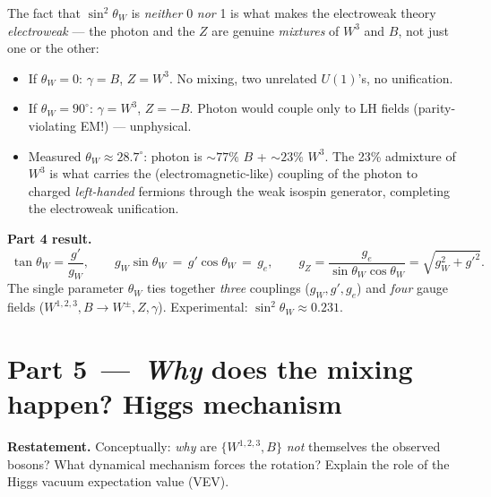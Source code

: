 \documentclass[11pt]{article}
\begin{document}
\begin{intuitionbox}
The fact that $\sin^2\theta_W$ is \emph{neither} 0 \emph{nor} 1 is what makes the
electroweak theory \emph{electroweak} --- the photon and the $Z$ are genuine \emph{mixtures}
of $W^3$ and $B$, not just one or the other:
\begin{itemize}[leftmargin=*]
  \item If $\theta_W = 0$: $\gamma = B$, $Z = W^3$. No mixing, two unrelated $U(1)$'s, no
        unification.
  \item If $\theta_W = 90^\circ$: $\gamma = W^3$, $Z = -B$. Photon would couple only to LH
        fields (parity-violating EM!) --- unphysical.
  \item Measured $\theta_W \approx 28.7^\circ$: photon is $\sim 77\%$ $B$ + $\sim 23\%$ $W^3$.
        The 23\% admixture of $W^3$ is what carries the (electromagnetic-like) coupling of the
        photon to charged \emph{left-handed} fermions through the weak isospin generator,
        completing the electroweak unification.
\end{itemize}
\end{intuitionbox}

\begin{resultbox}
\textbf{Part 4 result.}
\[
\boxed{\;
\tan\theta_W = \frac{g'}{g_W},
\qquad
g_W \sin\theta_W \,=\, g' \cos\theta_W \,=\, g_e,
\qquad
g_Z = \frac{g_e}{\sin\theta_W\cos\theta_W} = \sqrt{g_W^2 + g'^2}.
\;}
\]
The single parameter $\theta_W$ ties together \emph{three} couplings ($g_W, g', g_e$) and
\emph{four} gauge fields ($W^{1,2,3}, B \to W^\pm, Z, \gamma$). Experimental:
$\sin^2\theta_W \approx 0.231$.
\end{resultbox}

\newpage

\section*{Part 5 \,---\, \emph{Why} does the mixing happen? Higgs mechanism}

\begin{problembox}
\textbf{Restatement.} Conceptually: \emph{why} are $\{W^{1,2,3}, B\}$ \emph{not} themselves
the observed bosons? What dynamical mechanism forces the rotation? Explain the role of
the Higgs vacuum expectation value (VEV).
\end{problembox}
\end{document}
